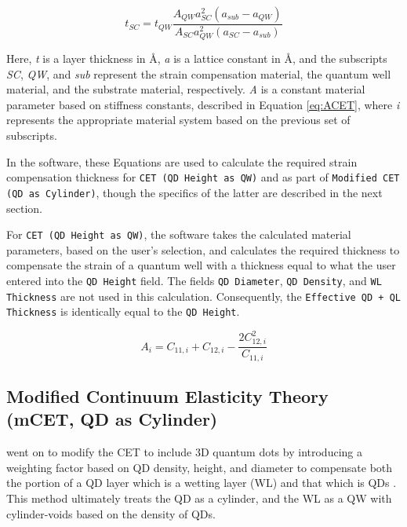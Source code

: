 \documentclass{article}
\begin{document}
\begin{equation}
\label{eq:tCET}
t_{SC}=t_{QW}\frac{A_{QW}a_{SC}^{2}(a_{sub}-a_{QW})}{A_{SC}a_{QW}^{2}(a_{SC}-a_{sub})}
\end{equation}

Here, \emph{t} is a layer thickness in \AA{}, \emph{a} is a lattice constant in \AA{}, and the subscripts \emph{SC}, \emph{QW}, and \emph{sub} represent the strain compensation material, the quantum well material, and the substrate material, respectively. \emph{A} is a constant material parameter based on stiffness constants, described in Equation \ref{eq:ACET}, where \emph{i} represents the appropriate material system based on the previous set of subscripts.

In the software, these Equations are used to calculate the required strain compensation thickness for \texttt{CET (QD Height as QW)} and as part of \texttt{Modified CET (QD as Cylinder)}, though the specifics of the latter are described in the next section.

For \texttt{CET (QD Height as QW)}, the software takes the calculated material parameters, based on the user's selection, and calculates the required thickness to compensate the strain of a quantum well with a thickness equal to what the user entered into the \texttt{QD Height} field. The fields \texttt{QD Diameter}, \texttt{QD Density}, and \texttt{WL Thickness} are not used in this calculation. Consequently, the \texttt{Effective QD + QL Thickness} is identically equal to the \texttt{QD Height}.


\begin{equation}
\label{eq:ACET}
A_{i}=C_{11,i}+C_{12,i}-\frac{2C_{12,i}^{2}}{C_{11,i}}
\end{equation}
\FloatBarrier
\subsection{Modified Continuum Elasticity Theory (mCET, QD as Cylinder)}
\citeauthor{bailey_evaluation_2009} went on to modify the CET to include 3D quantum dots by introducing a weighting factor based on QD density, height, and diameter to compensate both the portion of a QD layer which is a wetting layer (WL) and that which is QDs \cite{bailey_evaluation_2009}. This method ultimately treats the QD as a cylinder, and the WL as a QW with cylinder-voids based on the density of QDs.
\end{document}
